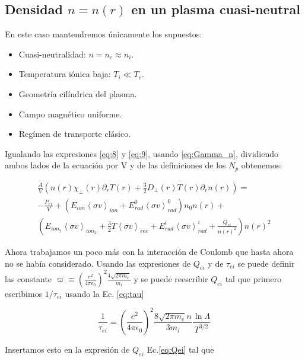 \subsection{Densidad $n = n(r)$ en un plasma cuasi-neutral}

  En este caso mantendremos \'unicamente los supuestos:

  \begin{itemize}
    \item Cuasi-neutralidad: $n = n_e \approx n_i$.
    \item Temperatura i\'onica baja: $T_i \ll T_e$.
    \item Geometr\'ia cil\'indrica del plasma.
    \item Campo magn\'etico uniforme.
    \item Reg\'imen de transporte clásico.
  \end{itemize}

  Igualando las expresiones \eqref{eq:8} y \eqref{eq:9}, usando \eqref{eq:Gamma_n}, dividiendo ambos lados de la ecuaci\'on por V y de las definiciones de los $N_p$ obtenemos:

  \begin{eqnarray*}
  \frac{A}{V}\left(n(r)\chi_\perp(r)\partial_r T(r) + \frac{3}{2}D_\perp(r) T(r) \partial_r n(r)\right) = \\
  -\frac{P_{rf}}{V} + (E_{ion}\left<\sigma v\right>_{ion} + E_{rad}^0\left<\sigma v\right>_{rad}^0)n_0 n(r) + \\ \left(E_{ion_2}\left<\sigma v\right>_{ion_2} + \frac{3}{2}T\left<\sigma v\right>_{rec} + E_{rad}^i\left<\sigma v\right>_{rad}^i + \frac{Q_{ei}}{n(r)^2}\right)n(r)^2
\end{eqnarray*}

Ahora trabajamos un poco m\'as con la interacci\'on de Coulomb que hasta ahora no se hab\'ia considerado. Usando las expresiones de $Q_{ei}$ y de $\tau_{ei}$ se puede definir las constante $\varpi \equiv \left(\frac{e^2}{4\pi\epsilon_0}\right)^2\frac{4\sqrt{2\pi m_e}}{m_i}$ y se puede reescribir $Q_{ei}$ tal que primero escribimos $1 / \tau_{ei}$ usando la Ec. \eqref{eq:tau}

  \begin{equation*}
    \frac{1}{\tau_{ei}} = \left(\frac{e^2}{4\pi\epsilon_0}\right)^2\frac{8\sqrt{2\pi m_e}n}{3 m_i}\frac{\ln{\Lambda}}{T^{3/2}}
  \end{equation*} 

  Insertamos esto en la expresi\'on de $Q_{ei}$ Ec.\eqref{eq:Qei} tal que 


